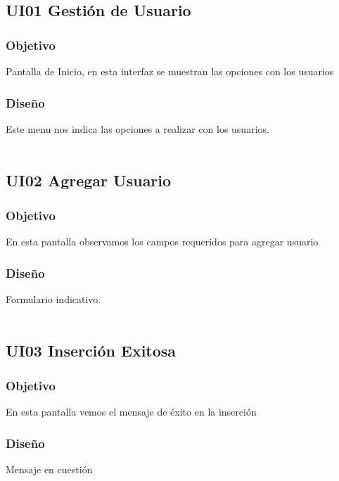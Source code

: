 \newpage
\subsection{UI01 Gestión de Usuario}

\subsubsection{Objetivo}
	Pantalla de Inicio, en esta interfaz se muestran las opciones con los usuarios

\subsubsection{Diseño}
	Este menu nos indica las opciones a realizar con los usuarios.  \\\\


\newpage
\subsection{UI02 Agregar Usuario}

\subsubsection{Objetivo}
	En esta pantalla observamos los campos requeridos para agregar usuario

\subsubsection{Diseño}
	Formulario indicativo.  \\\\



\newpage
\subsection{UI03 Inserción Exitosa}

\subsubsection{Objetivo}
	En esta pantalla vemos el mensaje de éxito en la inserción

\subsubsection{Diseño}
	Mensaje en cuestión  \\\\





